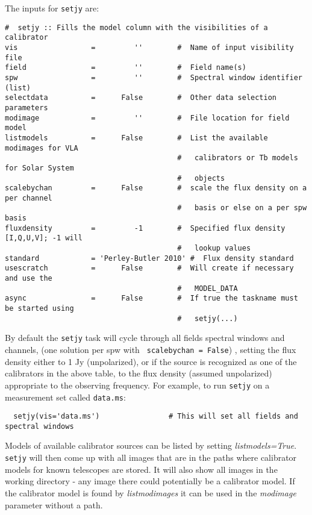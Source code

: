 The inputs for {\tt setjy} are:
\small
\begin{verbatim}
#  setjy :: Fills the model column with the visibilities of a calibrator
vis                 =         ''        #  Name of input visibility file
field               =         ''        #  Field name(s)
spw                 =         ''        #  Spectral window identifier (list)
selectdata          =      False        #  Other data selection parameters
modimage            =         ''        #  File location for field model
listmodels          =      False        #  List the available modimages for VLA
                                        #   calibrators or Tb models for Solar System
                                        #   objects
scalebychan         =      False        #  scale the flux density on a per channel
                                        #   basis or else on a per spw basis
fluxdensity         =         -1        #  Specified flux density [I,Q,U,V]; -1 will
                                        #   lookup values
standard            = 'Perley-Butler 2010' #  Flux density standard
usescratch          =      False        #  Will create if necessary and use the
                                        #   MODEL_DATA
async               =      False        #  If true the taskname must be started using
                                        #   setjy(...)
\end{verbatim}
\normalsize By default the {\tt setjy} task will cycle through all
fields spectral windows and channels, (one solution per spw with {\tt
  scalebychan = False}) , setting the flux density either to 1 Jy
(unpolarized), or if the source is recognized as one of the
calibrators in the above table, to the flux density (assumed
unpolarized) appropriate to the observing frequency.  For example, to
run {\tt setjy} on a measurement set called {\tt data.ms}: \small
\begin{verbatim}
  setjy(vis='data.ms')                # This will set all fields and spectral windows
\end{verbatim}
\normalsize

Models of available calibrator sources can be listed by setting {\it
  listmodels=True}. {\tt setjy} will then come up with all images
that are in the paths where calibrator models for known telescopes are
stored. It will also show all images in the working directory - any
image there could potentially be a calibrator model. If the calibrator
model is found by {\it listmodimages} it can be used in the {\it
  modimage} parameter without a path.

